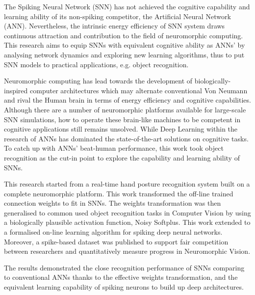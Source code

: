 The Spiking Neural Network (SNN) has not achieved the cognitive capability and learning ability of its non-spiking competitor, the Artificial Neural Network (ANN).
Nevertheless, the intrinsic energy efficiency of SNN system draws continuous attraction and contribution to the field of neuromorphic computing.
This research aims to equip SNNs with equivalent cognitive ability as ANNs' by analysing network dynamics and exploring new learning algorithms, thus to put SNN models to practical applications, e.g. object recognition.

Neuromorphic computing has lead towards the development of biologically-inspired computer architectures which may alternate conventional Von Neumann and rival the Human brain in terms of energy efficiency and cognitive capabilities.
Although there are a number of neuromorphic platforms available for large-scale SNN simulations, how to operate these brain-like machines to be competent in cognitive applications still remains unsolved.
While Deep Learning within the research of ANNs has dominated the state-of-the-art solutions on cognitive tasks.
To catch up with ANNs' beat-human performance, this work took object recognition as the cut-in point to explore the capability and learning ability of SNNs.

This research started from a real-time hand posture recognition system built on a complete neuromorphic platform.
This work transformed the off-line trained connection weights to fit in SNNs.
The weights transformation was then generalised to common used object recognition tasks in Computer Vision by using a biologically plausible activation function, Noisy Softplus.
This work extended to a formalised on-line learning algorithm for spiking deep neural networks.
Moreover, a spike-based dataset was published to support fair competition between researchers and quantitatively measure progress in Neuromorphic Vision.

The results demonstrated the close recognition performance of SNNs comparing to conventional ANNs thanks to the effective weights transformation, and the equivalent learning capability of spiking neurons to build up deep architectures.
